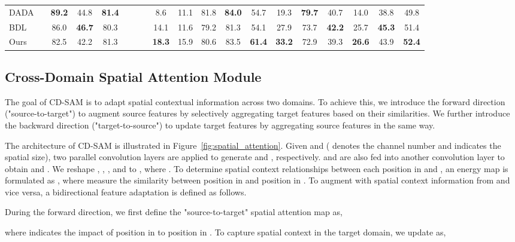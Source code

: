 \documentclass[10pt,twocolumn,letterpaper]{article}
\begin{document}
\begin{table*}[t]
\begin{center}
\begin{tabular}{ @{} l|c|*{16}{c}|*{1}{c} @{} }
				DADA \cite{vu2019dada} &  &
				\bf 89.2 & 44.8 & \bf 81.4 & \xmark & \xmark & \xmark & 8.6 & 11.1 & 81.8 & \bf 84.0 & 54.7 & 19.3 & \bf 79.7 & 40.7 & 14.0 & 38.8 & 49.8 \\

				BDL \cite{li2019bidirectional} &  &
				86.0 & \bf 46.7 & 80.3 & \xmark & \xmark & \xmark & 14.1 & 11.6 & 79.2 & 81.3 & 54.1 & 27.9 & 73.7 & \bf 42.2 & 25.7 & \bf 45.3 & 51.4 \\

				Ours &  &
				82.5 & 42.2 & 81.3 & \xmark & \xmark & \xmark & \bf 18.3 & 15.9 & 80.6 & 83.5 &
				\bf 61.4 & \bf 33.2 & 72.9 & 39.3 & \bf 26.6 & 43.9 & \bf 52.4 \\

				\bottomrule
			\end{tabular}
		\end{center}
		\vspace{-0.3in}
	\end{table*}

	\subsection{Cross-Domain Spatial Attention Module}

	The goal of CD-SAM is to adapt spatial contextual information across two domains. To achieve this, we introduce the forward direction ("source-to-target") to augment source features by selectively aggregating target features based on their similarities. We further introduce the backward direction ("target-to-source") to update target features by aggregating source features in the same way.

	The architecture of CD-SAM is illustrated in Figure~\ref{fig:spatial_attention}. Given  and  ( denotes the channel number and  indicates the spatial size), two parallel convolution layers are applied to generate  and , respectively.  and  are also fed into another convolution layer to obtain  and . We reshape , , , and  to , where . To determine spatial context relationships between each position in  and , an energy map  is formulated as , where  measure the similarity between  position in  and  position in . To augment  with spatial context information from  and vice versa, a bidirectional feature adaptation is defined as follows.

	During the forward direction, we first define the "source-to-target" spatial attention map as,
	
	where  indicates the impact of  position in  to  position in . To capture spatial context in the target domain, we update  as,
	
\end{document}
